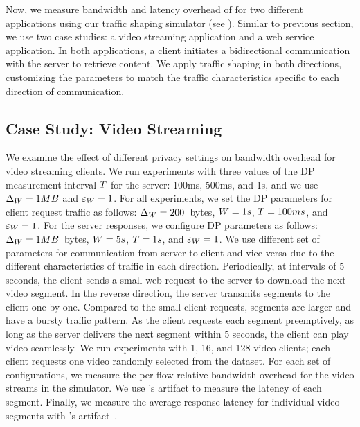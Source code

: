 Now, we measure bandwidth and latency overhead of {\sys} for two different applications using our traffic shaping simulator (see ).
Similar to previous section, we use two case studies: a video streaming application and a web service application. 
In both applications, a client initiates a bidirectional communication with the server to retrieve content.
We apply traffic shaping in both directions, customizing the parameters to match the traffic characteristics specific to each direction of communication.


\subsection{Case Study: Video Streaming}\label{subsec:eval-bw-video}
We examine the effect of different privacy settings on bandwidth overhead for video streaming clients.
We run experiments with three values of the DP measurement interval $T$ for the server:
100ms, 500ms, and 1s, and we use $\Delta_{W} = 1 MB$ and $\varepsilon_{W} = 1$.
For all experiments, we set the DP parameters for client request traffic as follows: $\Delta_{W} = 200$~bytes, $W = 1s$, $T = 100ms$, and $\varepsilon_{W} = 1$.
For the server responses, we configure DP parameters as follows: $\Delta_{W} = 1 MB$~bytes, $W = 5s$, $T = 1 s$, and $\varepsilon_{W} = 1$.
We use different set of parameters for communication from server to client and vice versa due to the different characteristics of traffic in each direction.
Periodically, at intervals of 5 seconds, the client sends a small web request  to the server to download the next video segment. 
In the reverse direction, the server transmits segments to the client one by one.
Compared to the small client requests, segments are larger and have a bursty traffic pattern.
As the client requests each segment preemptively, as long as the server delivers the next segment within 5 seconds, the client can play video seamlessly. 
We run experiments with 1, 16, and 128 video clients; each client requests one video randomly selected from the dataset.
For each set of configurations, we measure the per-flow relative bandwidth overhead for the video streams in the simulator.
We use {\sys}'s artifact to measure the latency of each segment.
Finally, we measure the average response latency for individual video segments with {\sys}'s artifact~\cite{netshaper_repo}.

